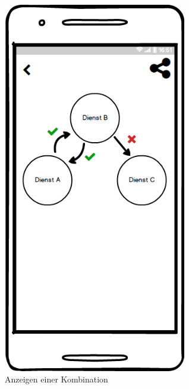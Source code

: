 \begin{figure}[ht]
	\centering
	\includegraphics[keepaspectratio,width=8cm]{img/Kombination_anzeigen_Verbunden}
	\caption{Anzeigen einer Kombination}
\end{figure}

